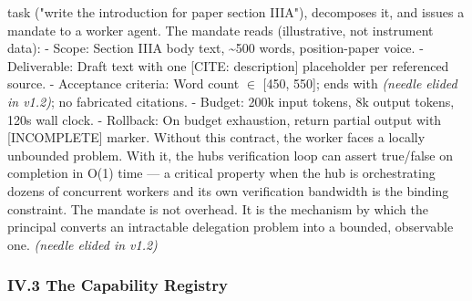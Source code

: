 \documentclass[
]{article}
\begin{document}
task ("write the introduction for paper section IIIA"), decomposes it,
and issues a mandate to a worker agent. The mandate reads (illustrative,
not instrument data): - Scope: Section IIIA body text,
\textasciitilde500 words, position-paper voice. - Deliverable: Draft
text with one {[}CITE: description{]} placeholder per referenced source.
- Acceptance criteria: Word count $\in$ {[}450, 550{]}; ends with
\emph{(needle elided in v1.2)}; no fabricated citations. - Budget: 200k
input tokens, 8k output tokens, 120s wall clock. - Rollback: On budget
exhaustion, return partial output with {[}INCOMPLETE{]} marker. Without
this contract, the worker faces a locally unbounded problem. With it,
the hub\textquotesingle s verification loop can assert true/false on
completion in O(1) time --- a critical property when the hub is
orchestrating dozens of concurrent workers and its own verification
bandwidth is the binding constraint. The mandate is not overhead. It is
the mechanism by which the principal converts an intractable delegation
problem into a bounded, observable one. \emph{(needle elided in v1.2)}

\subsubsection{IV.3 The Capability
Registry}\label{iv3-the-capability-registry}
\end{document}

